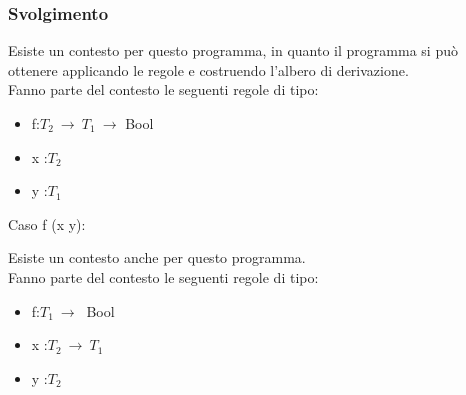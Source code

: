 \subsubsection*{Svolgimento}
 	\begin{prooftree} 
	\end{prooftree} 
	
	Esiste un contesto per questo programma, in quanto il programma si pu\`o ottenere applicando le regole e costruendo l'albero di derivazione. \\
	Fanno parte del contesto le seguenti regole di tipo:
\begin{itemize}
	\item f:$T_2\:\rightarrow\:T_1\:\rightarrow$ Bool
	\item x :$T_2$
	\item y :$T_1$
\end{itemize}

\vspace*{2 cm}
Caso f (x y):\\
 	\begin{prooftree} 
	\end{prooftree} 
	
	Esiste un contesto anche per questo programma. \\
	Fanno parte del contesto le seguenti regole di tipo:
\begin{itemize}
	\item f:$T_1\:\rightarrow\:$ Bool
	\item x :$T_2\:\rightarrow\:T_1$
	\item y :$T_2$
\end{itemize}


